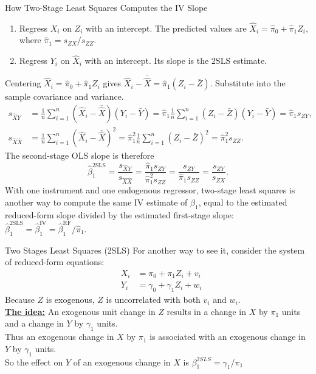 \documentclass[notes,10pt, aspectratio=169]{beamer}
\begin{document}
\begin{frame}{How Two-Stage Least Squares Computes the IV Slope}
\small
\setlength{\abovedisplayskip}{4pt}
\setlength{\belowdisplayskip}{4pt}
\begin{enumerate}
    \item Regress $X_i$ on $Z_i$ with an intercept. The predicted values are $\hat X_i=\hat\pi_0+\hat\pi_1 Z_i$, where $\hat\pi_1=s_{ZX}/s_{ZZ}$.
    \item Regress $Y_i$ on $\hat X_i$ with an intercept. Its slope is the 2SLS estimate.
\end{enumerate}
\medskip
Centering $\hat X_i=\hat\pi_0+\hat\pi_1 Z_i$ gives
$\hat X_i-\overline{\hat X}=\hat\pi_1(Z_i-\bar Z)$. Substitute into the sample covariance and variance.
\[
\begin{aligned}
s_{\hat X Y}
&=\frac{1}{n}\sum_{i=1}^{n}(\hat X_i-\overline{\hat X})(Y_i-\bar Y)
=\hat\pi_1\frac{1}{n}\sum_{i=1}^{n}(Z_i-\bar Z)(Y_i-\bar Y)
=\hat\pi_1s_{ZY},\\
s_{\hat X\hat X}
&=\frac{1}{n}\sum_{i=1}^{n}(\hat X_i-\overline{\hat X})^2
=\hat\pi_1^2\frac{1}{n}\sum_{i=1}^{n}(Z_i-\bar Z)^2
=\hat\pi_1^2s_{ZZ}.
\end{aligned}
\]
The second-stage OLS slope is therefore
\[
\hat\beta_1^{\mathrm{2SLS}}
=\frac{s_{\hat X Y}}{s_{\hat X\hat X}}
=\frac{\hat\pi_1 s_{ZY}}{\hat\pi_1^2s_{ZZ}}
=\frac{s_{ZY}}{\hat\pi_1s_{ZZ}}
=\frac{s_{ZY}}{s_{ZX}}.
\]
With one instrument and one endogenous regressor, two-stage least squares is another way to compute the same IV estimate of $\beta_1$, equal to the estimated reduced-form slope divided by the estimated first-stage slope: $\hat\beta_1^{\mathrm{2SLS}}=\hat\beta_1^{\mathrm{IV}}=\hat\beta_1^{\mathrm{RF}}/\hat\pi_1$.
\end{frame}

\begin{frame}{Two Stages Least Squares (2SLS)}
For another way to see it, consider the system of reduced-form equations:
\begin{eqnarray*}
    & X_i &= \pi_0 + \pi_1 Z_i + v_i\\
    & Y_i &= \gamma_0 + \gamma_1 Z_i + w_i
\end{eqnarray*}
Because $Z$ is exogenous, $Z$ is uncorrelated with both $v_i$ and $w_i$.\\[1em]
\underline{\textbf{The idea:}} An exogenous unit change in $Z$ results in a change in $X$ by $\pi_1$ units and a change in $Y$ by $\gamma_1$ units.\\[1em]

Thus an exogenous change in  $X$ by $\pi_1$ is associated with an exogenous change in $Y$ by $\gamma_1$ units.\\[1em]

So the effect on $Y$ of an exogenous change in $X$ is $\beta_1^{2SLS} = \gamma_1/\pi_1$
\end{frame}
\end{document}

